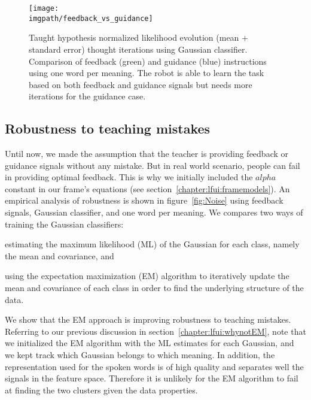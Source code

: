 \begin{figure}[!htbp]
  \centering
  \texttt{[image: \\imgpath/feedback\_vs\_guidance]}
  \caption{Taught hypothesis normalized likelihood evolution (mean + standard error) thought iterations using Gaussian classifier. Comparison of feedback (green) and guidance (blue) instructions using one word per meaning. The robot is able to learn the task based on both feedback and guidance signals but needs more iterations for the guidance case.}
  \label{fig:Guidance}
\end{figure}

\subsection{Robustness to teaching mistakes}

Until now, we made the assumption that the teacher is providing feedback or guidance signals without any mistake. But in real world scenario, people can fail in providing optimal feedback. This is why we initially included the $alpha$ constant in our frame's equations (see section~\ref{chapter:lfui:framemodels}). An empirical analysis of robustness is shown in figure~\ref{fig:Noise} using feedback signals, Gaussian classifier, and one word per meaning. We compares two ways of training the Gaussian classifiers: \begin{inparaenum}[(1)] \item estimating the maximum likelihood (ML) of the Gaussian for each class, namely the mean and covariance, and \item using the expectation maximization (EM) algorithm \cite{dempster1977maximum} to iteratively update the mean and covariance of each class in order to find the underlying structure of the data. \end{inparaenum} 


We show that the EM approach is improving robustness to teaching mistakes. Referring to our previous discussion in section~\ref{chapter:lfui:whynotEM}, note that we initialized the EM algorithm with the ML estimates for each Gaussian, and we kept track which Gaussian belongs to which meaning. In addition, the representation used for the spoken words is of high quality and separates well the signals in the feature space. Therefore it is unlikely for the EM algorithm to fail at finding the two clusters given the data properties.

